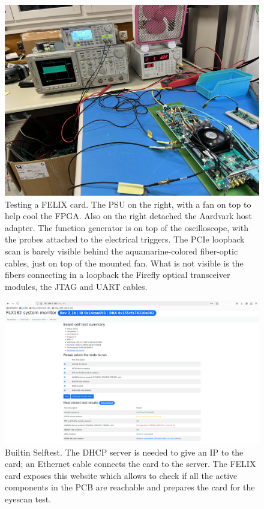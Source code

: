 \begin{figure}[H]
\centering
\includegraphics[width=\textwidth]{images/contributions/felix-card-testing.jpg}
\caption[Visual aid of FELIX card testing]{Testing a FELIX card. The PSU on the right, with a fan on top to help cool the \acs{FPGA}. Also on the right detached the Aardvark host adapter. The function generator is on top of the oscilloscope, with the probes attached to the electrical triggers. The \acs{PCIe} loopback scan is barely visible behind the aquamarine-colored fiber-optic cables, just on top of the mounted fan. What is not visible is the fibers connecting in a loopback the Firefly \protect\cite{firefly-optical-transceiver} optical transceiver modules, the JTAG and UART cables.}
\label{fig:felix-testing}
\end{figure}

\begin{figure}[H]
\centering
\includegraphics[width=\textwidth]{images/contributions/BIST.png}
\caption[Builtin Selftest screenshot]{Builtin Selftest. The DHCP server is needed to give an IP to the card; an Ethernet cable connects the card to the server. The \acs{FELIX} card exposes this website which allows to check if all the active components in the \acs{PCB} are reachable and prepares the card for the eyescan test.}
\label{fig:bist}
\end{figure}

